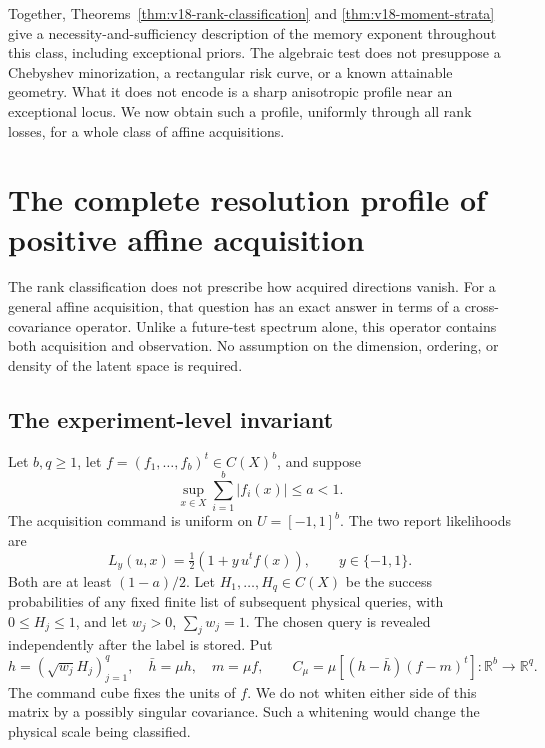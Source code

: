 \documentclass[11pt]{amsart}
\theoremstyle{definition}\newtheorem{definition}[theorem]{Definition}
\theoremstyle{remark}\newtheorem{remark}[theorem]{Remark}
\newcommand{\R}{\mathbb R}\newcommand{\N}{\mathbb N}\newcommand{\C}{\mathbb C}
\begin{document}
Together, Theorems~\ref{thm:v18-rank-classification} and
\ref{thm:v18-moment-strata} give a necessity-and-sufficiency description
of the memory exponent throughout this class, including exceptional
priors. The algebraic test does not presuppose a Chebyshev minorization,
a rectangular risk curve, or a known attainable geometry. What it does
not encode is a sharp anisotropic profile near an exceptional locus.
We now obtain such a profile, uniformly through all rank losses, for a
whole class of affine acquisitions.

\section{The complete resolution profile of positive affine acquisition}
\label{sec:v18-affine}
The rank classification does not prescribe how acquired directions
vanish. For a general affine acquisition, that question has an exact
answer in terms of a cross-covariance operator. Unlike a future-test
spectrum alone, this operator contains both acquisition and observation.
No assumption on the dimension, ordering, or density of the latent
space is required.

\subsection{The experiment-level invariant}
Let $b,q\ge1$, let $f=(f_1,\ldots,f_b)^t\in C(X)^b$, and suppose
\begin{equation}\label{eq:v18-affine-bound}
 \sup_{x\in X}\sum_{i=1}^b|f_i(x)|\le a<1.
\end{equation}
The acquisition command is uniform on $U=[-1,1]^b$. The two report
likelihoods are
\begin{equation}\label{eq:v18-affine-likelihood}
 L_y(u,x)=\tfrac12(1+y\,u^tf(x)),\qquad y\in\{-1,1\}.
\end{equation}
Both are at least $(1-a)/2$. Let $H_1,\ldots,H_q\in C(X)$ be the
success probabilities of any fixed finite list of subsequent physical
queries, with $0\le H_j\le1$, and let $w_j>0$, $\sum_jw_j=1$.
The chosen query is revealed independently after the label is stored.
Put
\begin{equation}\label{eq:v18-covariance}
 h=(\sqrt{w_j}H_j)_{j=1}^q,\quad \bar h=\mu h,\quad m=\mu f,
 \qquad C_\mu=\mu[(h-\bar h)(f-m)^t]:\R^b\longrightarrow\R^q.
\end{equation}
The command cube fixes the units of $f$. We do not whiten either side
of this matrix by a possibly singular covariance. Such a whitening
would change the physical scale being classified.
\end{document}
